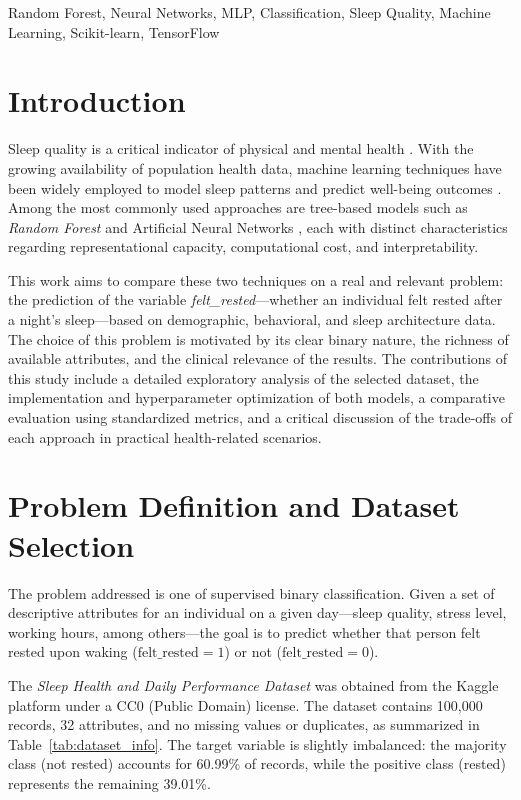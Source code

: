 \documentclass[conference]{IEEEtran}
\begin{document}
\begin{IEEEkeywords}
Random Forest, Neural Networks, MLP, Classification, Sleep Quality, Machine Learning, Scikit-learn, TensorFlow
\end{IEEEkeywords}

\section{Introduction}

Sleep quality is a critical indicator of physical and mental health \cite{walker2017}. With the growing availability of population health data, machine learning techniques have been widely employed to model sleep patterns and predict well-being outcomes \cite{shu2020}. Among the most commonly used approaches are tree-based models such as \textit{Random Forest} \cite{breiman2001} and Artificial Neural Networks \cite{goodfellow2016}, each with distinct characteristics regarding representational capacity, computational cost, and interpretability.

This work aims to compare these two techniques on a real and relevant problem: the prediction of the variable \textit{felt\_rested}---whether an individual felt rested after a night's sleep---based on demographic, behavioral, and sleep architecture data. The choice of this problem is motivated by its clear binary nature, the richness of available attributes, and the clinical relevance of the results. The contributions of this study include a detailed exploratory analysis of the selected dataset, the implementation and hyperparameter optimization of both models, a comparative evaluation using standardized metrics, and a critical discussion of the trade-offs of each approach in practical health-related scenarios.

\section{Problem Definition and Dataset Selection}

The problem addressed is one of supervised binary classification. Given a set of descriptive attributes for an individual on a given day---sleep quality, stress level, working hours, among others---the goal is to predict whether that person felt rested upon waking ($\text{felt\_rested} = 1$) or not ($\text{felt\_rested} = 0$).

The \textit{Sleep Health and Daily Performance Dataset} was obtained from the Kaggle platform \cite{dataset2024} under a CC0 (Public Domain) license. The dataset contains 100,000 records, 32 attributes, and no missing values or duplicates, as summarized in Table~\ref{tab:dataset_info}. The target variable is slightly imbalanced: the majority class (not rested) accounts for 60.99\% of records, while the positive class (rested) represents the remaining 39.01\%.
\end{document}
